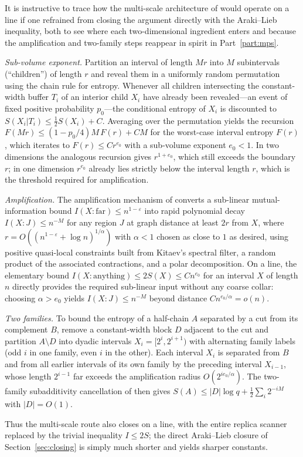 \begin{inwords}
It is instructive to trace how the multi-scale architecture of \cite{AL}
would operate on a line if one refrained from closing the argument directly
with the Araki--Lieb inequality, both to see where each two-dimensional
ingredient enters and because the amplification and two-family steps
reappear in spirit in Part~\ref{part:mps}.

\emph{Sub-volume exponent.} Partition an interval of length $Mr$ into $M$
subintervals (``children'') of length $r$ and reveal them in a uniformly
random permutation using the chain rule for entropy. Whenever all children
intersecting the constant-width buffer $T_i$ of an interior child $X_i$
have already been revealed—an event of fixed positive probability
$p_0$—the conditional entropy of $X_i$ is discounted to
$S(X_i|T_i)\le\frac12S(X_i)+C$. Averaging over the permutation yields the
recursion $F(Mr)\le(1-p_0/4)M\,F(r)+C M$ for the worst-case interval
entropy $F(r)$, which iterates to $F(r)\le Cr^{e_0}$ with a sub-volume
exponent $e_0<1$. In two dimensions the analogous recursion gives
$r^{1+e_0}$, which still exceeds the boundary $r$; in one
dimension $r^{e_0}$ already lies strictly below the interval length $r$,
which is the threshold required for amplification.

\emph{Amplification.} The amplification mechanism of \cite[Section~10]{AL}
converts a sub-linear mutual-information bound
$I(X:\text{far})\le n^{1-\varepsilon}$ into rapid polynomial decay
$I(X:J)\le n^{-M}$ for any region $J$ at graph distance at least $2r$ from
$X$, where $r=O((n^{1-\varepsilon}+\log n)^{1/\alpha})$ with $\alpha<1$
chosen as close to $1$ as desired, using positive quasi-local constraints
built from Kitaev's spectral filter, a random product of the associated
contractions, and a polar decomposition. On a line, the elementary bound
$I(X:\text{anything})\le2S(X)\le Cn^{e_0}$ for an interval $X$ of length
$n$ directly provides the required sub-linear input without any coarse
collar: choosing $\alpha>e_0$ yields $I(X:J)\le n^{-M}$ beyond distance
$Cn^{e_0/\alpha}=o(n)$.

\emph{Two families.} To bound the entropy of a half-chain $A$ separated by
a cut from its complement $B$, remove a constant-width block $D$ adjacent
to the cut and partition $A\setminus D$ into dyadic intervals
$X_i=[2^i,2^{i+1})$ with alternating family labels (odd $i$ in one family,
even $i$ in the other). Each interval $X_i$ is separated from $B$ and from
all earlier intervals of its own family by the preceding interval
$X_{i-1}$, whose length $2^{i-1}$ far exceeds the amplification radius
$O(2^{ie_0/\alpha})$. The two-family subadditivity cancellation of
\cite{AL} then gives $S(A)\le|D|\log q+\frac12\sum_i2^{-iM}$ with
$|D|=O(1)$.

Thus the multi-scale route also closes on a line, with the entire replica
scanner replaced by the trivial inequality $I\le 2S$; the direct
Araki--Lieb closure of Section~\ref{sec:closing} is simply much shorter
and yields sharper constants.
\end{inwords}

